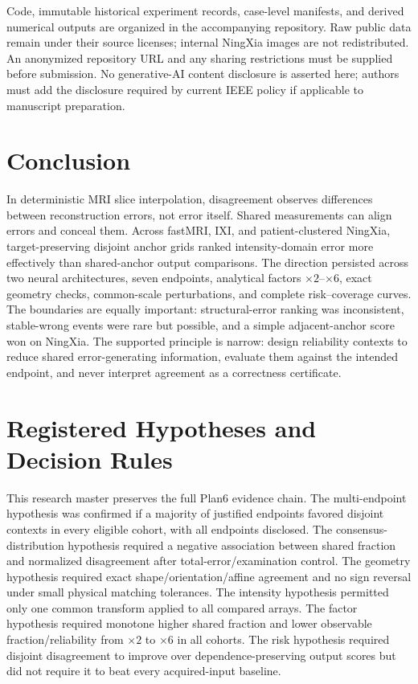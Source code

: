 \documentclass[journal,10pt]{IEEEtran}
\begin{document}
Code, immutable historical experiment records, case-level manifests, and derived numerical outputs are organized in the accompanying repository. Raw public data remain under their source licenses; internal NingXia images are not redistributed. An anonymized repository URL and any sharing restrictions must be supplied before submission. No generative-AI content disclosure is asserted here; authors must add the disclosure required by current IEEE policy if applicable to manuscript preparation.

\section{Conclusion}
In deterministic MRI slice interpolation, disagreement observes differences between reconstruction errors, not error itself. Shared measurements can align errors and conceal them. Across fastMRI, IXI, and patient-clustered NingXia, target-preserving disjoint anchor grids ranked intensity-domain error more effectively than shared-anchor output comparisons. The direction persisted across two neural architectures, seven endpoints, analytical factors $\times2$--$\times6$, exact geometry checks, common-scale perturbations, and complete risk--coverage curves. The boundaries are equally important: structural-error ranking was inconsistent, stable-wrong events were rare but possible, and a simple adjacent-anchor score won on NingXia. The supported principle is narrow: design reliability contexts to reduce shared error-generating information, evaluate them against the intended endpoint, and never interpret agreement as a correctness certificate.

\appendices
\section{Registered Hypotheses and Decision Rules}
This research master preserves the full Plan6 evidence chain. The multi-endpoint hypothesis was confirmed if a majority of justified endpoints favored disjoint contexts in every eligible cohort, with all endpoints disclosed. The consensus-distribution hypothesis required a negative association between shared fraction and normalized disagreement after total-error/examination control. The geometry hypothesis required exact shape/orientation/affine agreement and no sign reversal under small physical matching tolerances. The intensity hypothesis permitted only one common transform applied to all compared arrays. The factor hypothesis required monotone higher shared fraction and lower observable fraction/reliability from $\times2$ to $\times6$ in all cohorts. The risk hypothesis required disjoint disagreement to improve over dependence-preserving output scores but did not require it to beat every acquired-input baseline.
\end{document}
